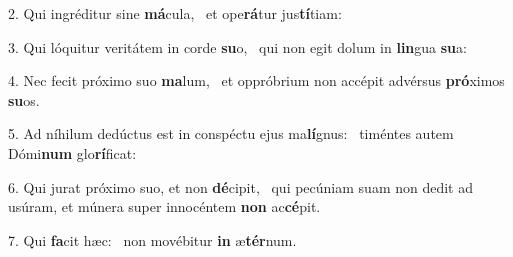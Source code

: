2. Qui ingréditur sine \textbf{má}cula, \ast\  et ope\textbf{rá}tur jus\textbf{tí}tiam:\

3. Qui lóquitur veritátem in corde \textbf{su}o, \ast\  qui non egit dolum in \textbf{lin}gua \textbf{su}a:\

4. Nec fecit próximo suo \textbf{ma}lum, \ast\  et oppróbrium non accépit advérsus \textbf{pró}ximos \textbf{su}os.\

5. Ad níhilum dedúctus est in conspéctu ejus ma\textbf{lí}gnus: \ast\  timéntes autem Dómi\textbf{num} glo\textbf{rí}ficat:\

6. Qui jurat próximo suo, et non \textbf{dé}cipit, \ast\  qui pecúniam suam non dedit ad usúram, et múnera super innocéntem \textbf{non} ac\textbf{cé}pit.\

7. Qui \textbf{fa}cit hæc: \ast\  non movébitur \textbf{in} æ\textbf{tér}num.\

